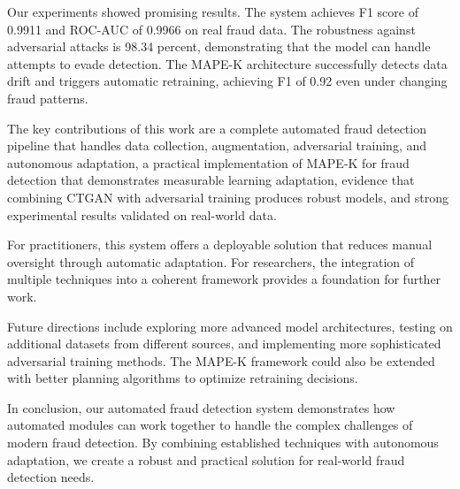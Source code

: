 \documentclass{svproc}
\begin{document}
Our experiments showed promising results. The system achieves F1 score of 0.9911 and ROC-AUC of 0.9966 on real fraud data. The robustness against adversarial attacks is 98.34 percent, demonstrating that the model can handle attempts to evade detection. The MAPE-K architecture successfully detects data drift and triggers automatic retraining, achieving F1 of 0.92 even under changing fraud patterns.

The key contributions of this work are a complete automated fraud detection pipeline that handles data collection, augmentation, adversarial training, and autonomous adaptation, a practical implementation of MAPE-K for fraud detection that demonstrates measurable learning adaptation, evidence that combining CTGAN with adversarial training produces robust models, and strong experimental results validated on real-world data.

For practitioners, this system offers a deployable solution that reduces manual oversight through automatic adaptation. For researchers, the integration of multiple techniques into a coherent framework provides a foundation for further work.

Future directions include exploring more advanced model architectures, testing on additional datasets from different sources, and implementing more sophisticated adversarial training methods. The MAPE-K framework could also be extended with better planning algorithms to optimize retraining decisions.

In conclusion, our automated fraud detection system demonstrates how automated modules can work together to handle the complex challenges of modern fraud detection. By combining established techniques with autonomous adaptation, we create a robust and practical solution for real-world fraud detection needs.



\end{document}
